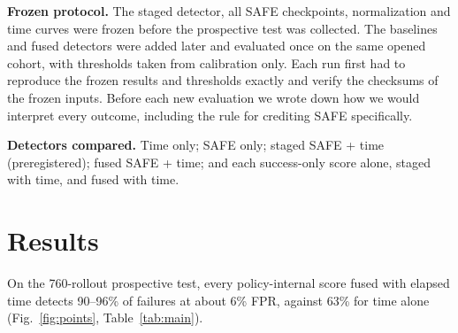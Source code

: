 \documentclass[conference,a4paper]{IEEEtran}
\begin{document}
\textbf{Frozen protocol.} The staged detector, all SAFE checkpoints, normalization and time
curves were frozen before the prospective test was collected. The baselines and fused
detectors were added later and evaluated once on the same opened cohort, with thresholds
taken from calibration only. Each run first had to reproduce the frozen results and
thresholds exactly and verify the checksums of the frozen inputs. Before each new
evaluation we wrote down how we would interpret every outcome, including the rule for
crediting SAFE specifically.

\textbf{Detectors compared.} Time only; SAFE only; staged SAFE + time (preregistered); fused
SAFE + time; and each success-only score alone, staged with time, and fused with time.

\section{Results}

On the 760-rollout prospective test, every policy-internal score fused with elapsed time
detects 90--96\% of failures at about 6\% FPR, against 63\% for time alone
(Fig.~\ref{fig:points}, Table~\ref{tab:main}).
\end{document}
